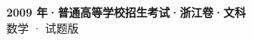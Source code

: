 \documentclass[zihao=-4, a4paper]{ctexart}
\begin{document}
\begin{center}
  {\Large\bfseries 2009 年·普通高等学校招生考试·浙江卷·文科}\\[4pt]
  {\large 数学 · 试题版}
\end{center}
\medskip
{}

\end{document}
